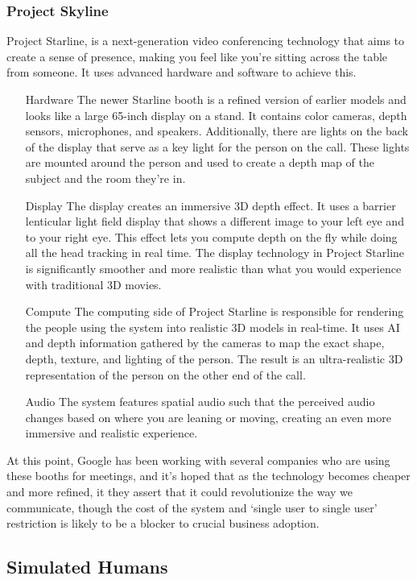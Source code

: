 \subsubsection{Project Skyline}
Project Starline, is a next-generation video conferencing technology that aims to create a sense of presence, making you feel like you're sitting across the table from someone. It uses advanced hardware and software to achieve this. 
\begin{itemize}
\item [Hardware] The newer Starline booth is a refined version of earlier models and looks like a large 65-inch display on a stand. It contains color cameras, depth sensors, microphones, and speakers. Additionally, there are lights on the back of the display that serve as a key light for the person on the call. These lights are mounted around the person and used to create a depth map of the subject and the room they're in.
\item [Display] The display creates an immersive 3D depth effect. It uses a barrier lenticular light field display that shows a different image to your left eye and to your right eye. This effect lets you compute depth on the fly while doing all the head tracking in real time. The display technology in Project Starline is significantly smoother and more realistic than what you would experience with traditional 3D movies.
\item [Compute] The computing side of Project Starline is responsible for rendering the people using the system into realistic 3D models in real-time. It uses AI and depth information gathered by the cameras to map the exact shape, depth, texture, and lighting of the person. The result is an ultra-realistic 3D representation of the person on the other end of the call.
\item [Audio] The system features spatial audio such that the perceived audio changes based on where you are leaning or moving, creating an even more immersive and realistic experience.
\end{itemize}
At this point, Google has been working with several companies who are using these booths for meetings, and it's hoped that as the technology becomes cheaper and more refined, it they assert that it could revolutionize the way we communicate, though the cost of the system and `single user to single user' restriction is likely to be a blocker to crucial business adoption.
\subsection{Simulated Humans}
